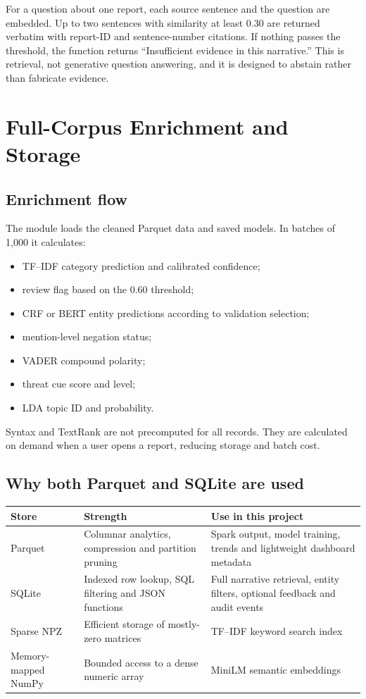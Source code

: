 \documentclass[12pt,a4paper]{report}
\begin{document}
For a question about one report, each source sentence and the question are embedded. Up to two sentences with similarity at least 0.30 are returned verbatim with report-ID and sentence-number citations. If nothing passes the threshold, the function returns ``Insufficient evidence in this narrative.'' This is retrieval, not generative question answering, and it is designed to abstain rather than fabricate evidence.

\chapter{Full-Corpus Enrichment and Storage}

\section{Enrichment flow}

The module  loads the cleaned Parquet data and saved models. In batches of 1,000 it calculates:

\begin{itemize}
  \item TF--IDF category prediction and calibrated confidence;
  \item review flag based on the 0.60 threshold;
  \item CRF or BERT entity predictions according to validation selection;
  \item mention-level negation status;
  \item VADER compound polarity;
  \item threat cue score and level;
  \item LDA topic ID and probability.
\end{itemize}

Syntax and TextRank are not precomputed for all records. They are calculated on demand when a user opens a report, reducing storage and batch cost.

\section{Why both Parquet and SQLite are used}

\begin{longtable}{p{}p{}p{}}
\toprule
Store & Strength & Use in this project \\
\midrule
\endhead
Parquet & Columnar analytics, compression and partition pruning & Spark output, model training, trends and lightweight dashboard metadata \\
SQLite & Indexed row lookup, SQL filtering and JSON functions & Full narrative retrieval, entity filters, optional feedback and audit events \\
Sparse NPZ & Efficient storage of mostly-zero matrices & TF--IDF keyword search index \\
Memory-mapped NumPy & Bounded access to a dense numeric array & MiniLM semantic embeddings \\
\bottomrule
\end{longtable}
\end{document}
